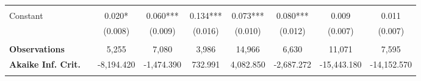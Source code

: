 \begin{tabular*}{\linewidth}{@{\extracolsep{\fill} } llccccccc}
\arrayrulecolor{white}%
\hline%
\arrayrulecolor{white}%
\hline%
\arrayrulecolor{white}%
\hline%
\arrayrulecolor{white}%
\hline%
\arrayrulecolor{white}%
\hline%
&&&&&&&&\\%
\multirow{2}{*}{Constant}&&0.020*&0.060***&0.134***&0.073***&0.080***&0.009&0.011\\%
&&(0.008)&(0.009)&(0.016)&(0.010)&(0.012)&(0.007)&(0.007)\\%
\arrayrulecolor{white}%
\hline%
\arrayrulecolor{white}%
\hline%
\arrayrulecolor{white}%
\hline%
\arrayrulecolor{white}%
\hline%
\arrayrulecolor{white}%
\hline%
&&&&&&&&\\%
\bfseries Observations&&5,255&7,080&3,986&14,966&6,630&11,071&7,595\\%
\bfseries Akaike Inf. Crit.&&{-}8,194.420&{-}1,474.390&732.991&4,082.850&{-}2,687.272&{-}15,443.180&{-}14,152.570\\%
\arrayrulecolor{white}%
\hline%
\arrayrulecolor{white}%
\hline%
\arrayrulecolor{white}%
\hline%
\arrayrulecolor{white}%
\hline%
\arrayrulecolor{white}%
\hline%
\arrayrulecolor{black}%
\hline%
\end{tabular*}